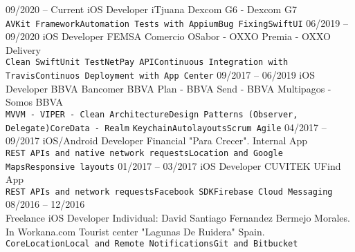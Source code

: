 \documentclass[8pt]{developercv} %
\begin{document}
\begin{entrylist}
						\entry
		{09/2020 -- Current}
		{iOS Developer}
		{iTjuana}
		{Dexcom G6 - Dexcom G7
		\\ \texttt{AVKit Framework}\slashsep\texttt{Automation Tests with Appium}\slashsep\texttt{Bug Fixing}\slashsep\texttt{SwiftUI}	
		}
				\entry
		{06/2019 -- 09/2020}
		{iOS Developer}
		{FEMSA Comercio}
		{OSabor - OXXO Premia - OXXO Delivery
		\\ \texttt{Clean Swift}\slashsep\texttt{Unit Test}\slashsep\texttt{NetPay API}\slashsep\texttt{Continuous Integration with Travis}\slashsep\texttt{Continuos Deployment with App Center}		
		}
				\entry
		{09/2017 -- 06/2019}
		{iOS Developer}
		{BBVA Bancomer}
		{BBVA Plan - BBVA Send - BBVA Multipagos - Somos BBVA
		\\ \texttt{MVVM - VIPER - Clean Architecture}\slashsep\texttt{Design Patterns (Observer, Delegate)}\slashsep\texttt{CoreData - Realm}\slashsep		
		 \texttt{Keychain}\slashsep\texttt{Autolayouts}\slashsep\texttt{Scrum Agile}		
		}
				\entry
		{04/2017 -- 09/2017}
		{iOS/Android Developer}
		{Financial "Para Crecer".}
		{Internal App
		\\ \texttt{REST APIs and native network requests}\slashsep\texttt{Location and Google Maps}\slashsep\texttt{Responsive layouts}		
		}
			\entry
		{01/2017 -- 03/2017}
		{iOS Developer}
		{CUVITEK}
		{UFind App
		\\ \texttt{REST APIs and network requests}\slashsep\texttt{Facebook SDK}\slashsep\texttt{Firebase Cloud Messaging}		
		}
	\entry
		{08/2016 -- 12/2016\\\footnotesize{Freelance}}
		{iOS Developer}
		{Individual: David Santiago Fernandez Bermejo Morales. In Workana.com}
		{Tourist center "Lagunas De Ruidera" Spain.
		\\ \texttt{CoreLocation}\slashsep\texttt{Local and Remote Notifications}\slashsep\texttt{Git and Bitbucket}		
		}









\end{entrylist}


\end{document}
